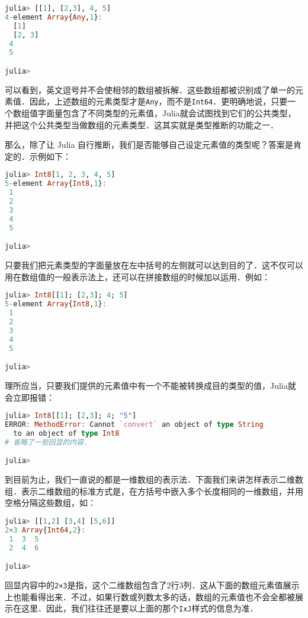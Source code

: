 \begin{lstlisting}[language=julia]
julia> [[1], [2,3], 4, 5]
4-element Array{Any,1}:
  [1]   
  [2, 3]
 4      
 5      

julia> 
\end{lstlisting}

可以看到，英文逗号并不会使相邻的数组被拆解．这些数组都被识别成了单一的元素值．因此，上述数组的元素类型才是\verb|Any|，而不是\verb|Int64|．更明确地说，只要一个数组值字面量包含了不同类型的元素值，Julia就会试图找到它们的公共类型，并把这个公共类型当做数组的元素类型．这其实就是类型推断的功能之一．

那么，除了让 Julia 自行推断，我们是否能够自己设定元素值的类型呢？答案是肯定的．示例如下：

\begin{lstlisting}[language=julia]
julia> Int8[1, 2, 3, 4, 5]
5-element Array{Int8,1}:
 1
 2
 3
 4
 5

julia> 
\end{lstlisting}

只要我们把元素类型的字面量放在左中括号的左侧就可以达到目的了．这不仅可以用在数组值的一般表示法上，还可以在拼接数组的时候加以运用．例如：

\begin{lstlisting}[language=julia]
julia> Int8[[1]; [2,3]; 4; 5]
5-element Array{Int8,1}:
 1
 2
 3
 4
 5

julia> 
\end{lstlisting}

理所应当，只要我们提供的元素值中有一个不能被转换成目的类型的值，Julia就会立即报错：

\begin{lstlisting}[language=julia]
julia> Int8[[1]; [2,3]; 4; "5"]
ERROR: MethodError: Cannot `convert` an object of type String 
  to an object of type Int8
# 省略了一些回显的内容．

julia> 
\end{lstlisting}

到目前为止，我们一直说的都是一维数组的表示法．下面我们来讲怎样表示二维数组．表示二维数组的标准方式是，在方括号中嵌入多个长度相同的一维数组，并用空格分隔这些数组，如：

\begin{lstlisting}[language=julia]
julia> [[1,2] [3,4] [5,6]]
2×3 Array{Int64,2}:
 1  3  5
 2  4  6

julia> 
\end{lstlisting}

回显内容中的\verb|2×3|是指，这个二维数组包含了2行3列．这从下面的数组元素值展示上也能看得出来．不过，如果行数或列数太多的话，数组的元素值也不会全都被展示在这里．因此，我们往往还是要以上面的那个\verb|IxJ|样式的信息为准．

